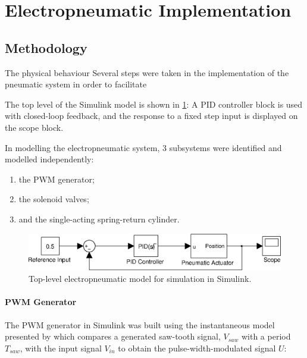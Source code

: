 \section{Electropneumatic Implementation}


\subsection{Methodology}

The physical behaviour 
Several steps were taken in the implementation of the pneumatic system in order to facilitate

The top level of the Simulink model is shown in \ref{fig:pneumatics_top_level}: A PID controller block is used with closed-loop feedback, and the response to a fixed step input is displayed on the scope block.

In modelling the electropneumatic system, 3 subsystems were identified and modelled independently:

\begin{enumerate}
  \item the PWM generator;
  \item the solenoid valves;
  \item and the single-acting spring-return cylinder.
\end{enumerate}

\begin{figure}[h]
\centering
\includegraphics[scale=1]{implementation/figures/pneumatic_modelling1}
\caption{Top-level electropneumatic model for simulation in Simulink.}
\label{fig:pneumatics_top_level}
\end{figure}

\paragraph{PWM Generator}

The PWM generator in Simulink was built using the instantaneous model presented by \citet{valve_models} which compares a generated saw-tooth signal, $V_{saw}$ with a period $T_{saw}$, with the input signal $V_{in}$ to obtain the pulse-width-modulated signal $U$:



